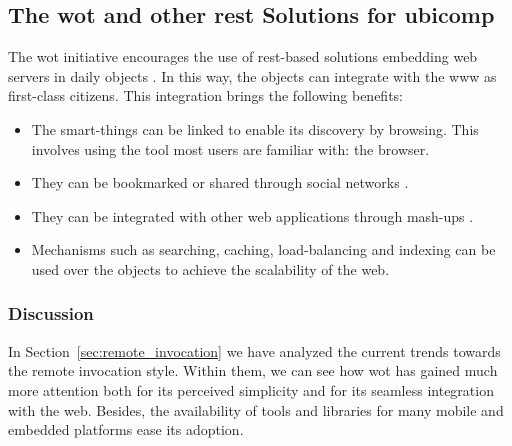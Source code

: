 \subsection{The \acl{wot} and other \ac{rest} Solutions for \acs{ubicomp}}



The \acl{wot} initiative encourages the use of \acs{rest}-based solutions embedding web servers in daily objects \citep{guinard_internet_2011}.
In this way, the objects can integrate with the \ac{www} as first-class citizens. %
This integration brings the following benefits:
\begin{itemize}
  \item The smart-things can be linked to enable its discovery by browsing. This involves using the tool most users are familiar with: the browser.
  \item They can be bookmarked or shared through social networks \citep{guinard_sharing_2010}.
  \item They can be integrated with other web applications through mash-ups \citep{guinard_towards_2009,ostermaier_webplug:_2010,pintus_anatomy_2011}.
  \item Mechanisms such as searching, caching, load-balancing and indexing can be used over the objects to achieve the scalability of the web. %
\end{itemize}




\subsubsection{Discussion}


In Section~\ref{sec:remote_invocation} we have analyzed the current trends towards the remote invocation style.
Within them, we can see how \ac{wot} has gained much more attention both for its perceived simplicity and for its seamless integration with the web.
Besides, the availability of tools and libraries for many mobile and embedded platforms ease its adoption.


